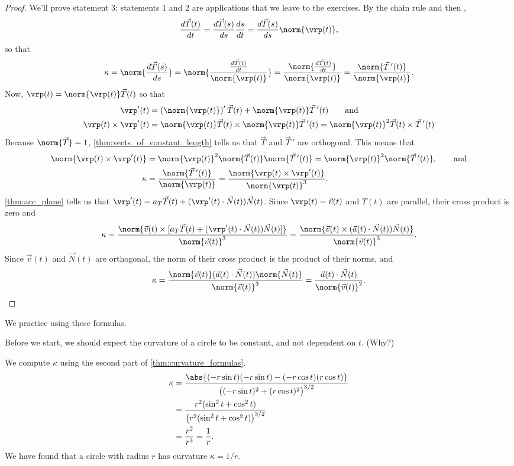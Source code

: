 \begin{proof}
We'll prove statement 3; statements 1 and 2 are applications that we leave to the exercises.  By the chain rule and then ,
\[
\frac{d\vec T(t)}{dt}
=\frac{d\vec T(s)}{ds}\frac{ds}{dt}
=\frac{d\vec T(s)}{ds}\norm{\vrp(t)},
\]
so that
\[
\kappa=\norm{\frac{d\vec T(s)}{ds}}
=\norm{\frac{\frac{d\vec T(t)}{dt}}{\norm{\vrp(t)}}}
=\frac{\norm{\frac{d\vec T(t)}{dt}}}{\norm{\vrp(t)}}
=\frac{\norm{\vec T\,'(t)}}{\norm{\vrp(t)}}.
\]
Now, $\vrp(t)=\norm{\vrp(t)}\vec T(t)$ so that
\begin{align*}
 \vrp'(t)&=\left(\norm{\vrp(t)}\right)'\vec T(t)+\norm{\vrp(t)}\vec T\,'(t)
 \qquad\text{and}\\
 \vrp(t)\times\vrp'(t)
 &=\norm{\vrp(t)}\vec T(t)\times\norm{\vrp(t)}\vec T\,'(t)
 =\norm{\vrp(t)}^2\vec T(t)\times\vec T\,'(t)
\end{align*}
Because $\norm{\vec T}=1$, \autoref{thm:vects_of_constant_length} tells us that $\vec T$ and $\vec T\,'$ are orthogonal.  This means that
\begin{align*}
 \norm{\vrp(t)\times\vrp'(t)}
 &=\norm{\vrp(t)}^2\norm{\vec T(t)}\norm{\vec T\,'(t)}
 =\norm{\vrp(t)}^2\norm{\vec T\,'(t)},\qquad\text{and}\\
 \kappa
 &=\frac{\norm{\vec T\,'(t)}}{\norm{\vrp(t)}}
 =\frac{\norm{\vrp(t)\times\vrp'(t)}}{\norm{\vrp(t)}^3}.
\end{align*}
\autoref{thm:acc_plane} tells us that $\vrp'(t)=a_T\vec T(t)+(\vrp'(t)\cdot\vec N(t))\vec N(t)$.  Since $\vrp(t)=\vec v(t)$ and $T(t)$ are parallel, their cross product is zero and
\[
 \kappa
 =\frac{\norm{\vec v(t)\times[a_T\vec T(t)+(\vrp'(t)\cdot\vec N(t))\vec N(t)]}}
 {\norm{\vec v(t)}^3}
 =\frac{\norm{\vec v(t)\times(\vec a(t)\cdot\vec N(t))\vec N(t)}}{\norm{\vec v(t)}^3}.
\]
Since $\vec v(t)$ and $\vec N(t)$ are orthogonal, the norm of their cross product is the product of their norms, and
\[
\kappa
=\frac{\norm{\vec v(t)}(\vec a(t)\cdot\vec N(t))\norm{\vec N(t)}}{\norm{\vec v(t)}^3}
=\frac{\vec a(t)\cdot\vec N(t)}{\norm{\vec v(t)}^2}.\qedhere
\]
\end{proof}

We practice using these formulas.

{Before we start, we should expect the curvature of a circle to be constant, and not dependent on $t$. (Why?)

We compute $\kappa$ using the second part of \autoref{thm:curvature_formulas}.
\begin{align*}
	\kappa
	&= \frac{\abs{(-r\sin t)(-r\sin t) - (-r\cos t)(r\cos t)}}{\big( (-r\sin t)^2+(r\cos t)^2\big)^{3/2}} \smallskip\\
	&= \frac{r^2(\sin^2t+\cos^2t)}{\big(r^2(\sin^2t+\cos^2t)\big)^{3/2}}\smallskip\\
	&= \frac{r^2}{r^3} = \frac1r.
\end{align*}
We have found that a circle with radius $r$ has curvature $\kappa = 1/r$.}

